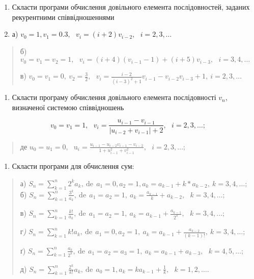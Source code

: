 \documentclass[]{article}
\begin{document}
\begin{enumerate}
\def\labelenumi{\arabic{enumi})}
\item
  Скласти програми обчислення довільного елемента послідовностей,
  заданих рекурентними співвідношеннями
\item
  а)
  \(v_{0} = 1,v_{1} = 0.3,\mathrm{\text{\ \ \ \ \ \ \ \ }}v_{i} = (i + 2)v_{i - 2},\mathrm{\text{\ \ \ }}i = 2,3,\ldots\)
\end{enumerate}

\begin{quote}
б)
\(v_{0} = v_{1} = v_{2} = 1,\mathrm{\text{\ \ \ \ \ \ \ \ }}v_{i} = (i + 4)(v_{i - 1} - 1) + (i + 5)v_{i - 3},\mathrm{\text{\ \ }}i = 3,4,\ldots\)

в)
\(v_{0} = v_{1} = 0,\ v_{2} = \frac{3}{2}\mathrm{,\ \ \ }v_{i} = \frac{i - 2}{(i - 3)^{2} + 1}v_{i - 1} - v_{i - 2}v_{i - 3} + 1,\ i = 2,3,\ldots\)
\end{quote}

\begin{enumerate}
\def\labelenumi{\arabic{enumi})}
\item
  Скласти програму обчислення довільного елемента послідовності
  \(v_{n}\), визначеної системою співвідношень
\end{enumerate}

\[v_{0} = v_{1} = 1,\mathrm{\text{\ \ \ \ }}v_{i} = \frac{u_{i - 1} - v_{i - 1}}{\left| u_{i - 2} + v_{i - 1} \right| + 2},\mathrm{\text{\ \ \ }}i = 2,3,\ldots;\]

\begin{quote}
де
\(u_{0} = u_{1} = 0,\mathrm{\text{\ \ \ \ }}\mathrm{u}_{i} = \frac{u_{i - 1} - u_{i - 2}v_{i - 1} - v_{i - 2}}{1 + u_{i - 1}^{2} + v_{i - 1}^{2}},\mathrm{\text{\ \ \ }}i = 2,3,\ldots;\)
\end{quote}

\begin{enumerate}
\def\labelenumi{\arabic{enumi})}
\item
  Скласти програми для обчислення сум:
\end{enumerate}

\begin{quote}
а)
\(S_{n} = \sum_{k = 1}^{n}{2^{k}a_{k}},\mathrm{\ de\ \ }a_{1} = 0,a_{2} = 1,a_{k} = a_{k - 1} + k*a_{k - 2},\ k = 3,4,\ldots;\)
б)
\(S_{n} = \sum_{k = 1}^{n}\frac{3^{k}}{a_{k}},\mathrm{\ de\ \ }a_{1} = a_{2} = 1,\ a_{k} = \frac{a_{k - 1}}{k} + a_{k - 2},\mathrm{\text{\ \ }}k = 3,4,\ldots;\)

в)
\(S_{n} = \sum_{k = 1}^{n}\frac{k!}{a_{k}},\mathrm{\ de\ \ }a_{1} = a_{2} = 1,\ a_{k} = a_{k - 1} + \frac{a_{k - 1}}{2^{k}},\mathrm{\text{\ \ }}k = 3,4,\ldots;\)

г\emph{)}
\(S_{n} = \sum_{k = 1}^{n}{k!a_{k}},\mathrm{\ de\ \ }a_{1} = 0,a_{2} = 1,\ a_{k} = a_{k - 1} + \frac{a_{k - 2}}{(k - 1)!},\ k = 3,4,\ldots;\)

ґ)
\(S_{n} = \sum_{k = 1}^{n}\frac{a_{k}}{2^{k}},\mathrm{\ de\ \ }a_{1} = a_{2} = a_{3} = 1,\ a_{k} = a_{k - 1} + a_{k - 3},\mathrm{\text{\ \ }}k = 4,5,\ldots;\)

д)
\(S_{n} = \sum_{k = 1}^{n}{\frac{2^{k}}{k!}a_{k}},\mathrm{\ de\ \ }a_{0} = 1,a_{k} = ka_{k - 1} + \frac{1}{k},\mathrm{\text{\ \ }}k = 1,2,\ldots.\)
\end{quote}
\end{document}
